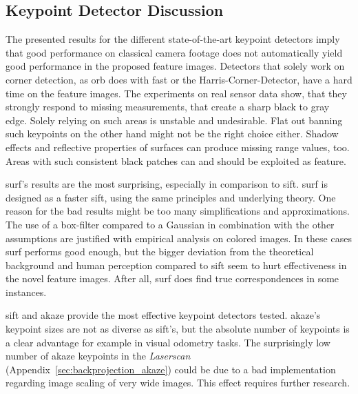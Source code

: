 \subsection{Keypoint Detector Discussion}

The presented results for the different state-of-the-art keypoint detectors imply that good performance on classical camera footage does not automatically yield good performance in the proposed feature images.
Detectors that solely work on corner detection, as \acrshort{orb} does with \acrshort{fast} or the Harris-Corner-Detector, have a hard time on the feature images.
The experiments on real sensor data show, that they strongly respond to missing measurements, that create a sharp black to gray edge.
Solely relying on such areas is unstable and undesirable.
Flat out banning such keypoints on the other hand might not be the right choice either.
Shadow effects and reflective properties of surfaces can produce missing range values, too.
Areas with such consistent black patches can and should be exploited as feature.

\acrshort{surf}'s results are the most surprising, especially in comparison to \acrshort{sift}.
\acrshort{surf} is designed as a faster \acrshort{sift}, using the same principles and underlying theory.
One reason for the bad results might be too many simplifications and approximations.
The use of a box-filter compared to a Gaussian in combination with the other assumptions are justified with empirical analysis on colored images.
In these cases \acrshort{surf} performs good enough, but the bigger deviation from the theoretical background and human perception compared to \acrshort{sift} seem to hurt effectiveness in the novel feature images.
After all, \acrshort{surf} does find true correspondences in some instances.

\acrshort{sift} and \acrshort{akaze} provide the most effective keypoint detectors tested.
\acrshort{akaze}'s keypoint sizes are not as diverse as \acrshort{sift}'s, but the absolute number of keypoints is a clear advantage for example in visual odometry tasks.
The surprisingly low number of \acrshort{akaze} keypoints in the \emph{Laserscan} (Appendix~\ref{sec:backprojection_akaze}) could be due to a bad implementation regarding image scaling of very wide images.
This effect requires further research.
